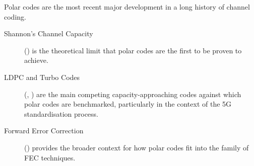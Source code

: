 \begin{importantbox}[title={Further Reading}]
    Polar codes are the most recent major development in a long history of channel coding.
    \begin{description}
        \item[Shannon's Channel Capacity] () is the theoretical limit that polar codes are the first to be proven to achieve.
        \item[LDPC and Turbo Codes] (, ) are the main competing capacity-approaching codes against which polar codes are benchmarked, particularly in the context of the 5G standardisation process.
        \item[Forward Error Correction] () provides the broader context for how polar codes fit into the family of FEC techniques.
    \end{description}
\end{importantbox}

